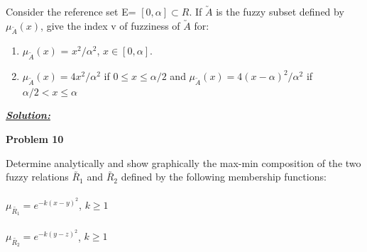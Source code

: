 \documentclass{article}
\begin{document}
\noindent Consider the reference set E= $[0, \alpha] \subset R$. If $\utilde{A}$ is the fuzzy subset defined by 
$\mu_{\utilde{A}}(x)$, give the index v of fuzziness of $\utilde{A}$ for:

\begin{enumerate} [label=\Alph*]
  \item $\mu_{\utilde{A}}(x)$ = $x^2/\alpha^2$, $x \in [0, \alpha].$
  \item $\mu_{\utilde{A}}(x) = 4x^2/\alpha^2$ if $0 \leq x\leq \alpha/2$ and $\mu_{\utilde{A}}(x) = 4(x-\alpha)^2/\alpha^2$ if $\alpha/2  <x \leq \alpha$
\end{enumerate}

\vspace{1cm}
\noindent \underline{\textbf{\textit{Solution:}}}


\newpage
\noindent \textbf{Problem 10}

\noindent Determine analytically and show graphically the max-min composition of the two fuzzy 
relations $\utilde{R_1}$ and $\utilde{R_2}$ defined by the following membership functions:\\ \\ $\mu_{\utilde{R_1}} = e^{-k(x-y)^2}$, $k \geq 1$
\\ \\ $\mu_{\utilde{R_2}} = e^{-k(y-z)^2}$, $k \geq 1$
\end{document}
